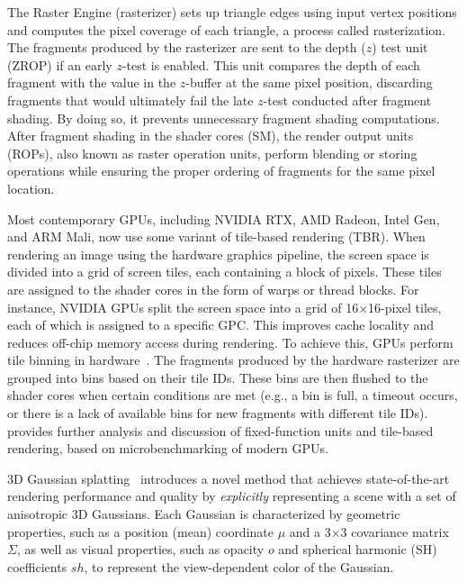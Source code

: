 The Raster Engine (rasterizer) sets up triangle edges using input vertex
positions and computes the pixel coverage of each triangle, a process called
rasterization. 
%
The fragments produced by the rasterizer are sent to the depth ($z$) test unit
(ZROP) if an early $z$-test is enabled.
%
This unit compares the depth of each fragment with the value in the $z$-buffer at
the same pixel position, discarding fragments that would ultimately fail the
late $z$-test conducted after fragment shading. By doing so, it prevents
unnecessary fragment shading computations.
%
After fragment shading in the shader cores (SM), the render output units
(ROPs), also known as raster operation units, perform blending or storing
operations while ensuring the proper ordering of fragments for the same pixel
location.

%
Most contemporary GPUs, including NVIDIA RTX, AMD Radeon, Intel Gen, and ARM
Mali, now use some variant of tile-based rendering (TBR).
%
When rendering an image using the hardware graphics pipeline, the screen space
is divided into a grid of screen tiles, each containing a block of pixels.
These tiles are assigned to the shader cores in the form of warps or thread
blocks.
%
For instance, NVIDIA GPUs split the screen space into a grid of
16$\times$16-pixel tiles, each of which is assigned to a specific GPC. 
%
This improves cache locality and reduces off-chip memory access during
rendering.
%
To achieve this, GPUs perform tile binning in hardware~\cite{gen11,lin:mor09}.
The fragments produced by the hardware rasterizer are grouped into bins based
on their tile IDs. These bins are then flushed to the shader cores when certain
conditions are met (e.g., a bin is full, a timeout occurs, or there is a lack
of available bins for new fragments with different tile IDs).
%
 provides further analysis and discussion of fixed-function
units and tile-based rendering, based on microbenchmarking of modern GPUs.



3D Gaussian splatting~\cite{ker:kop23} introduces a novel method that achieves
state-of-the-art rendering performance and quality by \emph{explicitly}
representing a scene with a set of anisotropic 3D Gaussians.
%
Each Gaussian is characterized by geometric properties, such as a position
(mean) coordinate $\mu$ and a 3$\times$3 covariance matrix $\Sigma$, as well as
visual properties, such as opacity $o$ and spherical harmonic (SH) coefficients
$sh$, to represent the view-dependent color of the Gaussian.

